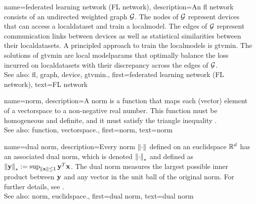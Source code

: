 {name={federated learning network (FL network)},
	description={An \gls{fl} network consists of 
		an undirected weighted \gls{graph} $\mathcal{G}$. The nodes of $\mathcal{G}$ represent \glspl{device} 
		that can access a \gls{localdataset} and train a \gls{localmodel}. The edges of $\mathcal{G}$ represent 
		communication links between \glspl{device} as well as statistical similarities between their \glspl{localdataset}. 
		A principled approach to train the \glspl{localmodel} is \gls{gtvmin}. The solutions of \gls{gtvmin} are local 
		\gls{modelparams} that optimally balance the \gls{loss} incurred on \glspl{localdataset} with their discrepancy 
		across the edges of $\mathcal{G}$. 
	    			\\ 
		See also: \gls{fl}, \gls{graph}, \gls{device}, \gls{gtvmin}.},
	first={federated learning network (FL network)},
	text={FL network} 
}

{name={norm},
	description={A norm is a \gls{function} that maps each (vector) element 
		of a \gls{vectorspace} to a non-negative real number. This \gls{function} must be 
		homogeneous and definite, and it must satisfy the triangle inequality \cite{HornMatAnalysis}.
		\\
		See also: \gls{function}, \gls{vectorspace}.},
	first={norm},
	text={norm} 
}

{name={dual norm},
	description={Every \gls{norm} $\left\Vert {\cdot} \right\Vert_{}$ defined on an \gls{euclidspace} $\mathbb{R}^{d}$ 
		has an associated dual \gls{norm}, which is denoted $\left\Vert {\cdot} \right\Vert_{*}$ and defined as 
		$\left\Vert {{\bf y}} \right\Vert_{*} := \sup_{\Vert {{\bf x}} \Vert{} \le 1} {\bf y}^{T} {\bf x}$. 
		The dual \gls{norm} measures the largest possible inner product between ${\bf y}$ 
		and any vector in the unit ball of the original \gls{norm}. For further details, see 
		\cite[Sec.~A.1.6]{BoydConvexBook}.
					\\ 
		See also: \gls{norm}, \gls{euclidspace}.},
	first={dual norm},
	text={dual norm}
}

